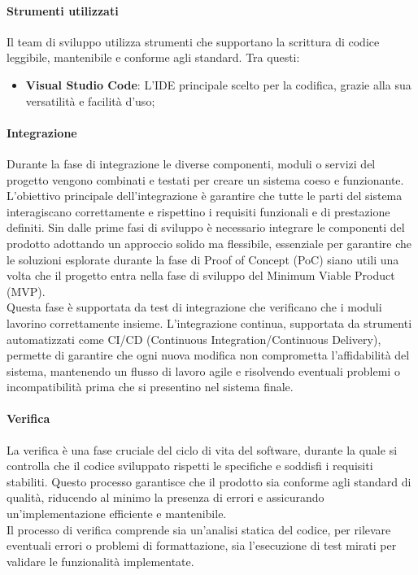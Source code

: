 \documentclass[10pt]{article}
\begin{document}
\begin{justify}
        \paragraph{Strumenti utilizzati}
        Il team di sviluppo utilizza strumenti che supportano la scrittura di codice leggibile, mantenibile e conforme agli standard. Tra questi:
        \begin{itemize}
            \item \textbf{Visual Studio Code}: L'IDE principale scelto per la codifica, grazie alla sua versatilità e facilità d'uso;
        \end{itemize}

        \paragraph{Integrazione}
        Durante la fase di integrazione le diverse componenti, moduli o servizi del progetto vengono combinati e testati per creare un sistema coeso e funzionante.\\ 
        L'obiettivo principale dell'integrazione è garantire che tutte le parti del sistema interagiscano correttamente e rispettino i requisiti funzionali e di prestazione definiti. 
        Sin dalle prime fasi di sviluppo è necessario integrare le componenti del prodotto adottando un approccio solido ma flessibile, essenziale per garantire che le soluzioni esplorate durante la fase di Proof of Concept (PoC) siano utili una volta che il progetto entra nella fase di sviluppo del Minimum Viable Product (MVP).\\
        Questa fase è supportata da test di integrazione che verificano che i moduli lavorino correttamente insieme. L'integrazione continua, supportata da strumenti automatizzati come CI/CD (Continuous Integration/Continuous Delivery), permette di garantire che ogni nuova modifica non comprometta l'affidabilità del sistema, mantenendo un flusso di lavoro agile e risolvendo eventuali problemi o incompatibilità prima che si presentino nel sistema finale.\\

        \paragraph{Verifica}
        La verifica è una fase cruciale del ciclo di vita del software, durante la quale si controlla che il codice sviluppato rispetti le specifiche e soddisfi i requisiti stabiliti. Questo processo garantisce che il prodotto sia conforme agli standard di qualità, riducendo al minimo la presenza di errori e assicurando un’implementazione efficiente e mantenibile.\\
        Il processo di verifica comprende sia un’analisi statica del codice, per rilevare eventuali errori o problemi di formattazione, sia l’esecuzione di test mirati per validare le funzionalità implementate.\\
    

\end{justify}
\end{document}
